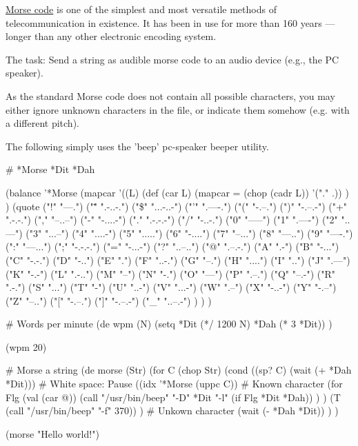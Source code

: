 \href{http://en.wikipedia.org/wiki/Morse\_code}{Morse code} is one of
the simplest and most versatile methods of telecommunication in
existence. It has been in use for more than 160 years --- longer than
any other electronic encoding system.

The task: Send a string as audible morse code to an audio device (e.g.,
the PC speaker).

As the standard Morse code does not contain all possible characters, you
may either ignore unknown characters in the file, or indicate them
somehow (e.g. with a different pitch).


\begin{wideverbatim}

The following simply uses the 'beep' pc-speaker beeper utility.

# *Morse *Dit *Dah

(balance '*Morse
   (mapcar
      '((L)
         (def (car L)
            (mapcar = (chop (cadr L)) '("." .)) ) )
      (quote
         ("!"  "---.")     ("\"" ".-..-.")   ("\$" "...-..-")   ("'" ".----.")
         ("(" "-.--.")     (")" "-.--.-")    ("+" ".-.-.")     ("," "--..--")
         ("-" "-....-")    ("." ".-.-.-")    ("/" "-..-.")
         ("0" "-----")     ("1" ".----")     ("2" "..---")     ("3" "...--")
         ("4" "....-")     ("5" ".....")     ("6" "-....")     ("7" "--...")
         ("8" "---..")     ("9" "----.")
         (":" "---...")    (";" "-.-.-.")    ("=" "-...-")     ("?" "..--..")
         ("@" ".--.-.")
         ("A" ".-")        ("B" "-...")      ("C" "-.-.")      ("D" "-..")
         ("E" ".")         ("F" "..-.")      ("G" "--.")       ("H" "....")
         ("I" "..")        ("J" ".---")      ("K" "-.-")       ("L" ".-..")
         ("M" "--")        ("N" "-.")        ("O" "---")       ("P" ".--.")
         ("Q" "--.-")      ("R" ".-.")       ("S" "...")       ("T" "-")
         ("U" "..-")       ("V" "...-")      ("W" ".--")       ("X" "-..-")
         ("Y" "-.--")      ("Z" "--..")
         ("[" "-.--.")     ("]" "-.--.-")    ("_" "..--.-") ) ) )

# Words per minute
(de wpm (N)
   (setq *Dit (*/ 1200 N)  *Dah (* 3 *Dit)) )

(wpm 20)

# Morse a string
(de morse (Str)
   (for C (chop Str)
      (cond
         ((sp? C) (wait (+ *Dah *Dit)))         # White space: Pause
         ((idx '*Morse (uppc C))                # Known character
            (for Flg (val (car @))
               (call "/usr/bin/beep" "-D" *Dit "-l" (if Flg *Dit *Dah)) ) )
         (T (call "/usr/bin/beep" "-f" 370)) )  # Unkown character
      (wait (- *Dah *Dit)) ) )

(morse "Hello world!")

\end{wideverbatim}

